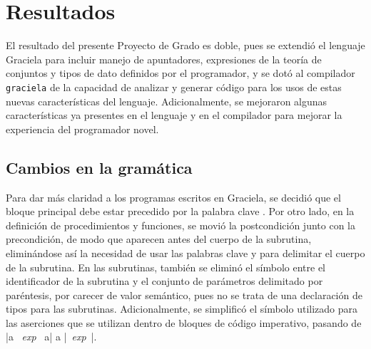 \chapter{Resultados}
\label{capitulo4}


El resultado del presente Proyecto de Grado es doble, pues se extendió el
lenguaje Graciela para incluir manejo de apuntadores, expresiones de la teoría
de conjuntos y tipos de dato definidos por el programador, y se dotó al
compilador \texttt{graciela} de la capacidad de analizar y generar código para
los usos de estas nuevas características del lenguaje. Adicionalmente, se
mejoraron algunas características ya presentes en el lenguaje y en el compilador
para mejorar la experiencia del programador novel.

\section{Cambios en la gramática}

Para dar más claridad a los programas escritos en Graciela, se decidió que el
bloque principal debe estar precedido por la palabra clave . Por
otro lado, en la definición de procedimientos y funciones, se movió la
postcondición junto con la precondición, de modo que aparecen antes del cuerpo de
la subrutina, eliminándose así la necesidad de usar las palabras clave
 y  para delimitar el cuerpo de la subrutina. En las
subrutinas, también se eliminó el  símbolo \ingra{:} entre el identificador de
la subrutina y el conjunto de parámetros delimitado por paréntesis, por carecer
de valor semántico, pues no se trata de una declaración de tipos para las
subrutinas. Adicionalmente, se simplificó el símbolo utilizado para las
aserciones que se utilizan dentro de bloques de código imperativo, pasando de
\ingra|{a ~\textit{exp}~ a}| a \ingra|{~\textit{exp}~}|.

%

